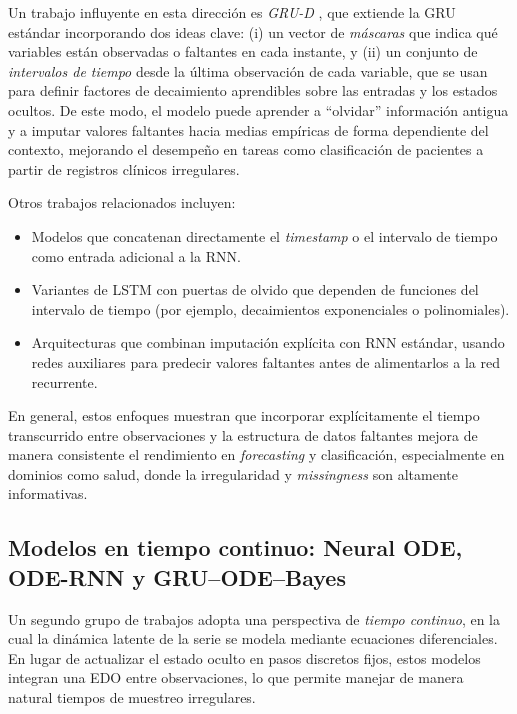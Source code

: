 \hfill

Un trabajo influyente en esta dirección es \emph{GRU-D} \cite{che2018recurrent}, que extiende la GRU estándar incorporando dos ideas clave: (i) un vector de \textit{máscaras} que indica qué variables están observadas o faltantes en cada instante, y (ii) un conjunto de \textit{intervalos de tiempo} desde la última observación de cada variable, que se usan para definir factores de decaimiento aprendibles sobre las entradas y los estados ocultos. De este modo, el modelo puede aprender a ``olvidar'' información antigua y a imputar valores faltantes hacia medias empíricas de forma dependiente del contexto, mejorando el desempeño en tareas como clasificación de pacientes a partir de registros clínicos irregulares.

\hfill

Otros trabajos relacionados incluyen:
\begin{itemize}
    \item Modelos que concatenan directamente el \emph{timestamp} o el intervalo de tiempo como entrada adicional a la RNN.
    \item Variantes de LSTM con puertas de olvido que dependen de funciones del intervalo de tiempo (por ejemplo, decaimientos exponenciales o polinomiales).
    \item Arquitecturas que combinan imputación explícita con RNN estándar, usando redes auxiliares para predecir valores faltantes antes de alimentarlos a la red recurrente.
\end{itemize}

En general, estos enfoques muestran que incorporar explícitamente el tiempo transcurrido entre observaciones y la estructura de datos faltantes mejora de manera consistente el rendimiento en \emph{forecasting} y clasificación, especialmente en dominios como salud, donde la irregularidad y \emph{missingness} son altamente informativas.

\subsection[Modelos en tiempo continuo: Neural ODE y variantes]{Modelos en tiempo continuo: Neural ODE, ODE-RNN y GRU–ODE–Bayes}

Un segundo grupo de trabajos adopta una perspectiva de \textit{tiempo continuo}, en la cual la dinámica latente de la serie se modela mediante ecuaciones diferenciales. En lugar de actualizar el estado oculto en pasos discretos fijos, estos modelos integran una EDO entre observaciones, lo que permite manejar de manera natural tiempos de muestreo irregulares.

